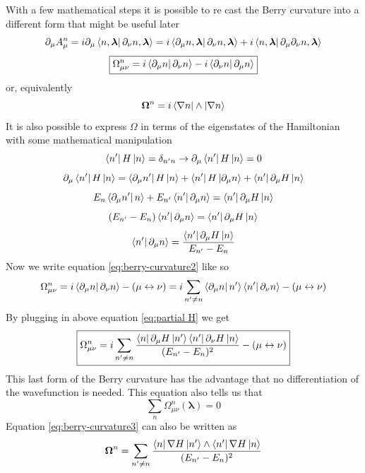         With a few mathematical steps it is possible to re cast the Berry curvature into a different form that might be useful later
        \[
            \partial_\mu A^n_\mu =i\partial_\mu \bra{n,\boldsymbol \lambda}\partial_\nu n,\boldsymbol \lambda \rangle= 
            i\bra{\partial_\mu n,\boldsymbol \lambda}\partial_\nu n,\boldsymbol \lambda \rangle + i\bra{n,\boldsymbol \lambda}\partial_\mu\partial_\nu n,\boldsymbol \lambda \rangle
        \]
        \begin{equation}
            \label{eq:berry-curvature2}
                \boxed{\Omega_{\mu\nu}^n =i\bra{\partial_\mu n}\partial_\nu n\rangle - i\bra{\partial_\nu n}\partial_\mu n\rangle}
        \end{equation}
        or, equivalently
        \begin{equation}
            \boldsymbol \Omega^n=i\bra{\nabla n}\wedge\ket{\nabla n}
        \end{equation}
        It is also possible to express $\Omega$ in terms of the eigenstates of the Hamiltonian with some mathematical manipulation
        \[
            \bra{n'} H \ket{n}=\delta_{n'n} \to \partial_\mu \bra{n'} H \ket{n}=0
        \]
        \[
        \partial_\mu \bra{n'} H \ket{n}=\bra{\partial_\mu n'}H\ket{n} + \bra{n'}H\ket{\partial_\mu n} + \bra{n'} \partial_\mu H\ket{n}
        \]
        \[
            E_{n}\bra{\partial_\mu n'}n\rangle + E_{n'} \bra{n'}\partial_\mu n\rangle=\bra{n'} \partial_\mu H\ket{n}
        \]
        \[
            (E_{n'}-E_n)\bra{n'} \partial_\mu n\rangle=\bra{n'} \partial_\mu H\ket{n}
        \]
        \begin{equation}
            \label{eq:partial H}
                \bra{n'}\partial_\mu n\rangle=  \frac{\bra{n'} \partial_\mu H\ket{n}}{E_{n'}-E_n}
        \end{equation}
        Now we write equation \ref{eq:berry-curvature2} like so
        \[
            \Omega_{\mu\nu}^n =i\bra{\partial_\mu n}\partial_\nu n\rangle - (\mu \leftrightarrow \nu)= i\sum_{n'\neq n}\bra{\partial_\mu n}n'\rangle\bra{n'}\partial_\nu n\rangle - (\mu \leftrightarrow \nu)
        \]
        By plugging in above equation \ref{eq:partial H} we get
        \begin{equation}
            \label{eq:berry-curvature3}
            \boxed{
                \Omega_{\mu\nu}^n=i\sum_{n'\neq n} \frac{\bra{n}\partial_\mu H\ket{n'}\bra{n'} \partial_\nu H\ket{n}}{(E_{n'}-E_n)^2}- (\mu \leftrightarrow \nu)
                }
        \end{equation}
        This last form of the Berry curvature has the advantage that no differentiation of the wavefunction is needed. This equation also tells us that
        \[ \sum_n \Omega_{\mu\nu}^n (\boldsymbol \lambda)=0 \]
        Equation \ref{eq:berry-curvature3} can also be written as
        \begin{equation}
            \boldsymbol\Omega^n=\sum_{n'\neq n} \frac{\bra{n}\nabla H\ket{n'}\wedge\bra{n'} \nabla H\ket{n}}{(E_{n'}-E_n)^2}
        \end{equation}


